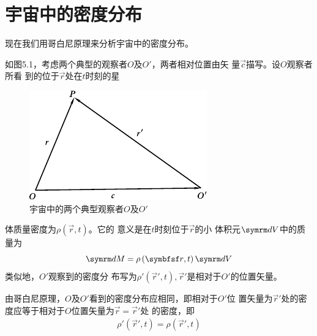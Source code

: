 \section{宇宙中的密度分布}\label{sec:05.02}

现在我们用哥白尼原理来分析宇宙中的密度分布。

如图5.1，考虑两个典型的观察者$ O $及$ O' $，两者相对位置由矢
量$ \vec{c} $描写。设$ O $观察者所看
到的位于$ \vec{r} $处在$ t $时刻的星
\begin{figure}
  \centering
  \includegraphics{figure/fig05.01}
  \caption{宇宙中的两个典型观察者$ O $及$ O' $}
  \label{fig:05.01}
\end{figure}
体质量密度为$ \rho \left( \vec{r} , t \right) $。它的
意义是在$ t $时刻位于$ \vec{r} $的小
体积元$ \dif V $中的质量为
{\setlength\mathindent{3em}
\begin{equation*}
  \dif M = \rho \left( \vec{r} , t \right) \dif V
\end{equation*}}
类似地，$ O' $观察到的密度分
布写为$ \rho ' \left( \vec{r} ' , t \right) , \vec{r} ' $是相对于$ O' $的位置矢量。

由哥白尼原理，$ O $及$ O' $看到的密度分布应相同，即相对于$ O' $位
置矢量为$ \vec{r} ' $处的密度应等于相对于$ O $位置矢量为$ \vec{r} = \vec{r} ' $处
的密度，即\vspace{-1.5em}
\begin{align}\label{eqn:05.02.01}
  \rho ' \left( \vec{r} ' , t \right) = \rho \left( \vec{r} ' , t \right)
\end{align}

